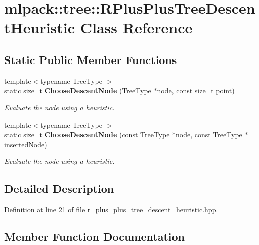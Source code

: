\section{mlpack\+:\+:tree\+:\+:R\+Plus\+Plus\+Tree\+Descent\+Heuristic Class Reference}
\label{classmlpack_1_1tree_1_1RPlusPlusTreeDescentHeuristic}
\subsection*{Static Public Member Functions}
\begin{DoxyCompactItemize}
\item 
{\footnotesize template$<$typename Tree\+Type $>$ }\\static size\+\_\+t {\bf Choose\+Descent\+Node} (Tree\+Type $\ast$node, const size\+\_\+t point)
\begin{DoxyCompactList}\small\item\em Evaluate the node using a heuristic. \end{DoxyCompactList}\item 
{\footnotesize template$<$typename Tree\+Type $>$ }\\static size\+\_\+t {\bf Choose\+Descent\+Node} (const Tree\+Type $\ast$node, const Tree\+Type $\ast$inserted\+Node)
\begin{DoxyCompactList}\small\item\em Evaluate the node using a heuristic. \end{DoxyCompactList}\end{DoxyCompactItemize}


\subsection{Detailed Description}


Definition at line 21 of file r\+\_\+plus\+\_\+plus\+\_\+tree\+\_\+descent\+\_\+heuristic.\+hpp.



\subsection{Member Function Documentation}
